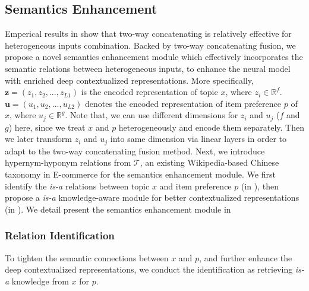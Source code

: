 
\subsection{Semantics Enhancement}
\label{sec:semantics}
Emperical results in  show that two-way concatenating is relatively effective for heterogeneous inputs combination.
Backed by two-way concatenating fusion, 
we propose a novel semantics enhancement module 
which effectively incorporates the semantic relations
between heterogeneous inputs,
to enhance the neural model
with enriched deep contextualized representations.
More specifically, 
$\textbf{z}=(z_1, z_2, ..., z_{L1})$ is the encoded representation of topic $x$,
where $z_i \in \mathbb{R}^{f}$.
$\textbf{u}=(u_1, u_2, ..., u_{L2})$ denotes the encoded representation of item preference $p$ of $x$, where $u_j \in \mathbb{ R }^{g}$.
Note that, we can use different dimensions for $z_i$ and $u_j$ ($f$ and $g$) here, 
since we treat $x$ and $p$ heterogeneously and encode them separately.
Then we later transform $z_i$ and $u_j$ into same dimension via linear layers in order to adapt to the two-way concatenating fusion method.
Next, we introduce hypernym-hyponym relations from $\mathcal{T}$, an existing Wikipedia-based Chinese taxonomy in E-commerce
for the semantics enhancement module.
We first identify the \emph{is-a} relations between topic $x$ and item preference $p$ 
(in ),
then propose a \emph{is-a} knowledge-aware module for better contextualized representations
(in ).
We detail present the semantics enhancement module
in 

\subsubsection{Relation Identification}
\label{sec:identification}
To tighten the semantic connections between $x$ and $p$,
and further enhance the deep contextualized representations,
we conduct the identification as retrieving 
\emph{is-a} knowledge from $x$ for $p$.

